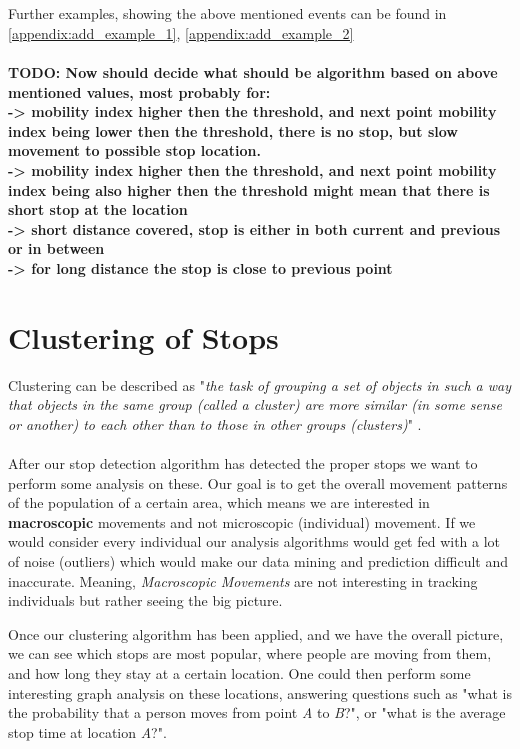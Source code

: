 \\\\
Further examples, showing the above mentioned events can be found in \autoref{appendix:add_example_1}, \autoref{appendix:add_example_2}
\\\\
\textbf{TODO: Now should decide what should be algorithm based on above mentioned values, most probably for:
\\-> mobility index higher then the threshold, and next point mobility index being lower then the threshold, there is no stop, but slow movement to possible stop location. 
\\-> mobility index higher then the threshold, and next point mobility index being also higher then the threshold might mean that there is short stop at the location
\\-> short distance covered, stop is either in both current and previous or in between
\\-> for long distance the stop is close to previous point}

\section{Clustering of Stops}

Clustering can be described as "\textit{the task of grouping a set of objects in such a way that objects in the same group (called a cluster) are more similar (in some sense or another) to each other than to those in other groups (clusters)}" \cite{clustering}. 
\\\\
After our stop detection algorithm has detected the proper stops we want to perform some analysis on these. Our goal is to get the overall movement patterns of the population of a certain area, which means we are interested in \textbf{macroscopic} movements and not microscopic (individual) movement. If we would consider every individual our analysis algorithms would get fed with a lot of noise (outliers) which would make our data mining and prediction difficult and inaccurate. Meaning, \textit{Macroscopic Movements} are not interesting in tracking individuals but rather seeing the big picture.

 Once our clustering algorithm has been applied, and we have the overall picture, we can see which stops are most popular, where people are moving from them, and how long they stay at a certain location. One could then perform some interesting graph analysis on these locations, answering questions such as "what is the probability that a person moves from point \textit{A} to \textit{B}?", or "what is the average stop time at location \textit{A}?". 
 
